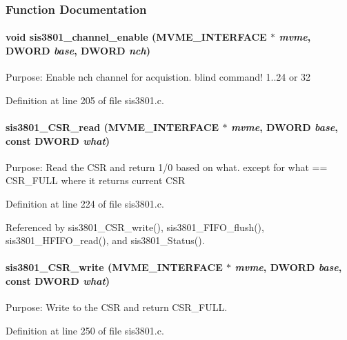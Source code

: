 \subsubsection{Function Documentation}
\paragraph[{sis3801\_\-channel\_\-enable}]{\setlength{\rightskip}{0pt plus 5cm}void sis3801\_\-channel\_\-enable ({\bf MVME\_\-INTERFACE} $\ast$ {\em mvme}, \/  {\bf DWORD} {\em base}, \/  {\bf DWORD} {\em nch})}\hfill\label{sis3801_8h_ac24aabb3d25468e91ab1da6640229f8e}
Purpose: Enable nch channel for acquistion. blind command! 1..24 or 32 

Definition at line 205 of file sis3801.c.
\paragraph[{sis3801\_\-CSR\_\-read}]{ sis3801\_\-CSR\_\-read ({\bf MVME\_\-INTERFACE} $\ast$ {\em mvme}, \/  {\bf DWORD} {\em base}, \/  const {\bf DWORD} {\em what})}\hfill\label{sis3801_8h_aac90e641397717a461ea29e640bcd529}
Purpose: Read the CSR and return 1/0 based on what. except for what == CSR\_\-FULL where it returns current CSR 

Definition at line 224 of file sis3801.c.

Referenced by sis3801\_\-CSR\_\-write(), sis3801\_\-FIFO\_\-flush(), sis3801\_\-HFIFO\_\-read(), and sis3801\_\-Status().
\paragraph[{sis3801\_\-CSR\_\-write}]{ sis3801\_\-CSR\_\-write ({\bf MVME\_\-INTERFACE} $\ast$ {\em mvme}, \/  {\bf DWORD} {\em base}, \/  const {\bf DWORD} {\em what})}\hfill\label{sis3801_8h_a307bd17779d86d4a2b915a853b8e606a}
Purpose: Write to the CSR and return CSR\_\-FULL. 

Definition at line 250 of file sis3801.c.
